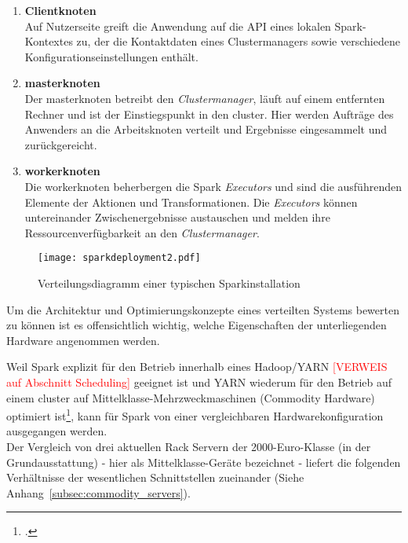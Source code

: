 \begin{enumerate}
	\item \textbf{Clientknoten}\\
	Auf Nutzerseite greift die Anwendung auf die API eines lokalen Spark-Kontextes zu, der die Kontaktdaten eines Clustermanagers sowie verschiedene Konfigurationseinstellungen enthält. 
	
	\item \textbf{\gls{master}knoten}\\
	Der \gls{master}knoten betreibt den \textit{Clustermanager}, läuft auf einem entfernten Rechner und ist der Einstiegspunkt in den \gls{cluster}. Hier werden Aufträge des Anwenders an die Arbeitsknoten verteilt und Ergebnisse eingesammelt und zurückgereicht.
	
	\item \textbf{\gls{worker}knoten}\\
	Die \gls{worker}knoten beherbergen die Spark \textit{Executors} und sind die ausführenden Elemente der Aktionen und Transformationen. Die \textit{Executors} können untereinander Zwischenergebnisse austauschen und melden ihre Ressourcenverfügbarkeit an den \textit{Clustermanager}.
\end{enumerate}

\begin{figure}[ht!]
	\centering
  \texttt{[image: sparkdeployment2.pdf]}
	\caption{Verteilungsdiagramm einer typischen Sparkinstallation}
	\label{figure:sparkdeployment}
\end{figure}

Um die Architektur und Optimierungskonzepte eines verteilten Systems bewerten zu können ist es offensichtlich wichtig, welche Eigenschaften der unterliegenden Hardware angenommen werden.

Weil Spark explizit für den Betrieb innerhalb eines Hadoop/YARN \textcolor{red}{[VERWEIS auf Abschnitt Scheduling]} geeignet ist und YARN wiederum für den Betrieb auf einem \gls{cluster} auf Mittelklasse-Mehrzweckmaschinen (Commodity Hardware) optimiert ist\footcite{Mer14}, kann für Spark von einer vergleichbaren Hardwarekonfiguration ausgegangen werden.\\

Der Vergleich von drei aktuellen Rack Servern der 2000-Euro-Klasse (in der Grundausstattung) - hier als Mittelklasse-Geräte bezeichnet - liefert die folgenden Verhältnisse der wesentlichen Schnittstellen zueinander (Siehe Anhang~\ref{subsec:commodity_servers}).

